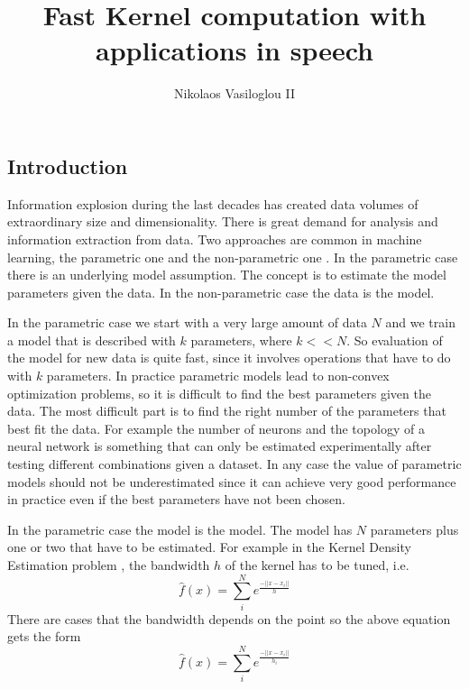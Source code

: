 \documentclass[12pt,letterpaper,doublespaced,ETD,dvips,proposal]{gtthesis}
\title{Fast Kernel computation with applications in speech}
\author{Nikolaos Vasiloglou II}
\begin{document}
\pagestyle{plain}

\begin{FrontMatter}
\contents %
\end{FrontMatter}

\begin{Body}
\section{Introduction}
\label{intro} Information explosion during the last decades has
created data volumes of extraordinary size and dimensionality. There
is great demand for analysis and information extraction from data.
Two approaches are common in machine learning, the parametric one
\cite{bishop2006pra, hastie2001esl, haykin1994nnc} and
the non-parametric one \cite{wasserman2006ans}. In the parametric case there is an underlying model
assumption. The concept is to estimate the model parameters given
the data. In the non-parametric case the data is the model.

In the parametric case we start with a very large amount of data $N$
and we train a model that is described with $k$ parameters, where
$k<<N$. So evaluation of the model for new data is quite fast, since
it involves operations that have to do with $k$ parameters. In
practice parametric models lead to non-convex optimization problems,
so it is difficult to find the best parameters given the data. The
most difficult part is to find the right number of the parameters
that best fit the data. For example the number of neurons and the
topology of a neural network is something that can only be
estimated experimentally after testing different combinations given
a dataset. In any case the value of parametric models should not be
underestimated since it can achieve very good performance in
practice even if the best parameters have not been chosen.

In the parametric case the model is the model. The model has $N$
parameters plus one or two that have to be estimated. For example in
the Kernel Density Estimation problem \cite{Silverman}, the bandwidth $h$ of the
kernel has to be tuned, i.e.
\begin{equation}
\hat{f}(x)=\sum_{i}^{N}e^{\frac{-||x-x_i||}{h}}
\end{equation}
There are cases that the bandwidth depends on the point so the above
equation gets the form
\begin{equation}
\hat{f}(x)=\sum_{i}^{N}e^{\frac{-||x-x_i||}{h_i}}
\end{equation}


\end{Body}
\end{document}

